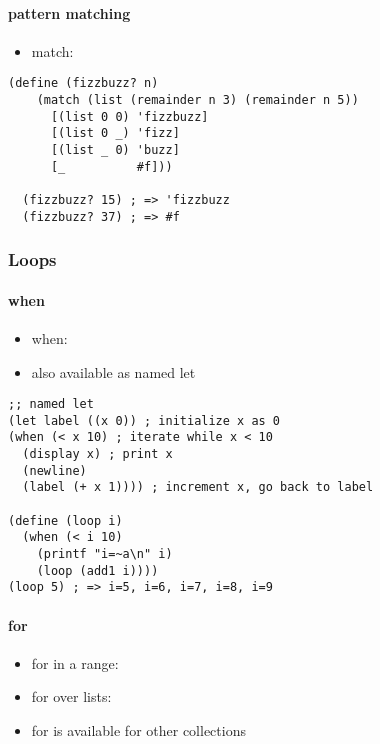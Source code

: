 \documentclass[a4paper,landscape,10pt]{article}
\begin{document}
\begin{multicols*}{2}
  \paragraph{pattern matching}

  \begin{itemize}
    \item match: 
  \end{itemize}

  \begin{lstlisting}[language=Racket]
    (define (fizzbuzz? n)
    (match (list (remainder n 3) (remainder n 5))
      [(list 0 0) 'fizzbuzz]
      [(list 0 _) 'fizz]
      [(list _ 0) 'buzz]
      [_          #f]))

  (fizzbuzz? 15) ; => 'fizzbuzz
  (fizzbuzz? 37) ; => #f
  \end{lstlisting}

  \subsubsection{Loops}

  \paragraph{when}

  \begin{itemize}
    \item when: 
    \item also available as named let
  \end{itemize}

  \begin{lstlisting}[language=Racket]
;; named let
(let label ((x 0)) ; initialize x as 0
(when (< x 10) ; iterate while x < 10
  (display x) ; print x
  (newline)
  (label (+ x 1)))) ; increment x, go back to label

(define (loop i)
  (when (< i 10)
    (printf "i=~a\n" i)
    (loop (add1 i))))
(loop 5) ; => i=5, i=6, i=7, i=8, i=9
  \end{lstlisting}

  \paragraph{for}

  \begin{itemize}
    \item for in a range: 
    \item for over lists: 
    \item for is available for other collections
  \end{itemize}


\end{multicols*}
\end{document}
